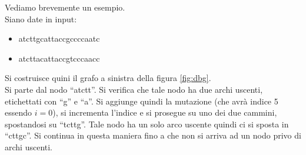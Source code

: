 \documentclass[a4paper,12pt, oneside]{book}
\begin{document}
\begin{esempio}
  Vediamo brevemente un esempio.\\
  Siano date in input:
  \begin{itemize}
    \item atcttgcattaccgccccaatc
    \item atcttacattaccgtcccaacc
  \end{itemize}
  Si costruisce quini il grafo a sinistra della figura \ref{fig:dbg}.\\
  Si parte dal nodo ``atctt''. Si verifica che tale nodo ha due archi uscenti,
  etichettati con ``g'' e ``a''. Si aggiunge quindi la mutazione (che avrà
  indice 5 essendo $i=0$), si incrementa
  l'indice e si prosegue su uno dei due cammini, spostandosi su ``tcttg''. Tale
  nodo ha un solo arco uscente quindi ci si sposta in ``cttgc''. Si
  continua in questa maniera fino a che non si arriva ad un nodo privo di archi
  uscenti. 
\end{esempio}
\end{document}

